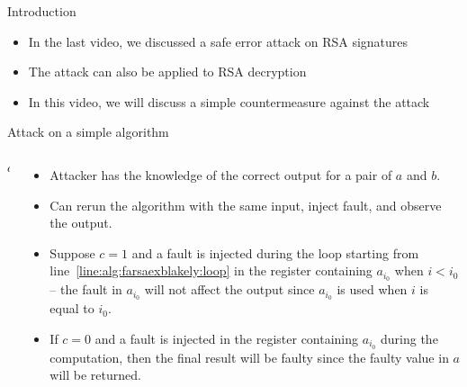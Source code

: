 \begin{frame}{Introduction}
    \begin{itemize}
        \item In the last video, we discussed a safe error attack on RSA signatures
        \item The attack can also be applied to RSA decryption
        \item In this video, we will discuss a simple countermeasure against the attack
    \end{itemize}
\end{frame}

\begin{frame}{Attack on a simple algorithm}
\begin{columns}[T] %
\begin{column}{.4\textwidth}
{
\setlength{\interspacetitleruled}{0pt}%
\setlength{\algotitleheightrule}{0pt}%
\begin{algorithm}[H]
  	\Return $a$
\end{algorithm}
}
\end{column}%
\hfill%
\begin{column}{.6\textwidth}
 \begin{itemize}
        \item Attacker has the knowledge of the correct output for a pair of $a$ and $b$.
       \item Can rerun the algorithm with the same input, inject fault, and observe the output.
        \item Suppose $c=1$ and a fault is injected during the loop starting from line~\ref{line:alg:farsaexblakely:loop} in the register containing $a_{i_0}$ when $i<i_0$ -- the fault in $a_{i_0}$ will not affect the output since $a_{i_0}$ is used when $i$ is equal to $i_0$.
       \item If $c=0$ and a fault is injected in the register containing $a_{i_0}$ during the computation, then the final result will be faulty since the faulty value in $a$ will be returned.
    \end{itemize}
\end{column}%
\end{columns}
\end{frame}


